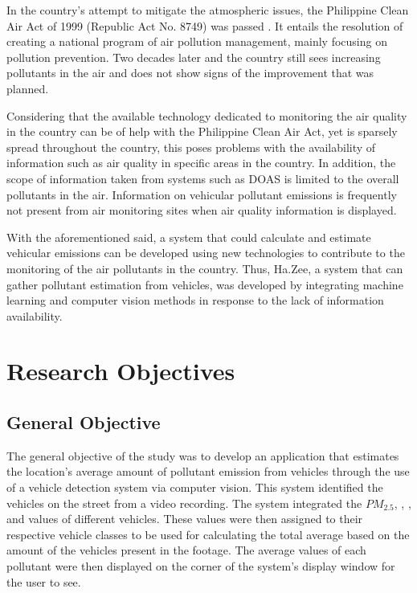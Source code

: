 In the country’s attempt to mitigate the atmospheric issues, the Philippine Clean Air Act of 1999 (Republic Act No. 8749) was passed \cite{FAO}. It entails the resolution of creating a national program of air pollution management, mainly focusing on pollution prevention. Two decades later and the country still sees increasing pollutants in the air and does not show signs of the improvement that was planned.

Considering that the available technology dedicated to monitoring the air quality in the country can be of help with the Philippine Clean Air Act, yet is sparsely spread throughout the country, this poses problems with the availability of information such as air quality in specific areas in the country. In addition, the scope of information taken from systems such as DOAS is limited to the overall pollutants in the air. Information on vehicular pollutant emissions is frequently not present from air monitoring sites when air quality information is displayed.

With the aforementioned said, a system that could calculate and estimate vehicular emissions can be developed using new technologies to contribute to the monitoring of the air pollutants in the country. Thus, Ha.Zee, a system that can gather pollutant estimation from vehicles, was developed by integrating machine learning and computer vision methods in response to the lack of information availability.



\section{Research Objectives}
\label{sec:researchobjectives}

\subsection{General Objective}
\label{sec:generalobjective}


The general objective of the study was to develop an application that estimates the location’s average amount of  pollutant emission from vehicles through the use of a vehicle detection system via computer vision. This system identified the vehicles on the street from a video recording. The system integrated the $PM_{2.5}$, , , and  values of different vehicles. These values were then assigned to their respective vehicle classes to be used for calculating the total average based on the amount of the vehicles present in the footage. The average values of each pollutant were then displayed on the corner of the system's display window for the user to see.



